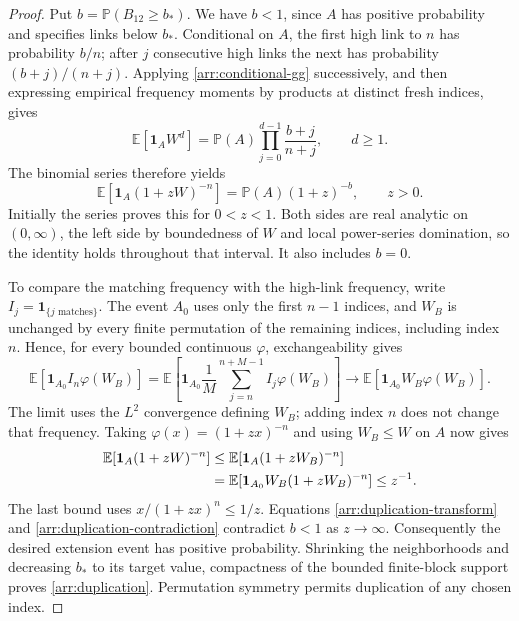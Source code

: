 \begin{proof}
Put $b=\mathbb P(B_{12}\geq b_*)$.  We have $b<1$, since $A$ has positive
probability and specifies links below $b_*$.  Conditional on $A$, the
first high link to $n$ has probability $b/n$; after $j$ consecutive high
links the next has probability $(b+j)/(n+j)$.  Applying
\eqref{arr:conditional-gg} successively, and then expressing empirical
frequency moments by products at distinct fresh indices, gives
\begin{equation}
 \mathbb E[\mathbf1_A W^d]
 =\mathbb P(A)\prod_{j=0}^{d-1}\frac{b+j}{n+j},
 \qquad d\geq1.
 \label{arr:duplication-moments}
\end{equation}
The binomial series therefore yields
\begin{equation}
 \mathbb E[\mathbf1_A(1+zW)^{-n}]
 =\mathbb P(A)(1+z)^{-b},\qquad z>0.
 \label{arr:duplication-transform}
\end{equation}
Initially the series proves this for $0<z<1$.  Both sides are real
analytic on $(0,\infty)$, the left side by boundedness of $W$ and local
power-series domination, so the identity holds throughout that interval.
It also includes $b=0$.

To compare the matching frequency with the high-link frequency, write
$I_j=\mathbf1_{\{j\text{ matches}\}}$.  The event $A_0$ uses only the
first $n-1$ indices, and $W_B$ is unchanged by every finite permutation
of the remaining indices, including index $n$.  Hence, for every bounded
continuous $\varphi$, exchangeability gives
\[
 \mathbb E[\mathbf1_{A_0}I_n\varphi(W_B)]
 =\mathbb E\left[\mathbf1_{A_0}
   \frac1M\sum_{j=n}^{n+M-1}I_j\varphi(W_B)\right]
 \longrightarrow
 \mathbb E[\mathbf1_{A_0}W_B\varphi(W_B)].
\]
The limit uses the $L^2$ convergence defining $W_B$; adding index $n$
does not change that frequency.  Taking
$\varphi(x)=(1+zx)^{-n}$ and using $W_B\le W$ on $A$ now gives
\begin{align}
 \mathbb E[\mathbf1_A(1+zW)^{-n}]
 &\leq\mathbb E[\mathbf1_A(1+zW_B)^{-n}]\notag\\
 &=\mathbb E[\mathbf1_{A_0}W_B(1+zW_B)^{-n}]
 \leq z^{-1}.
 \label{arr:duplication-contradiction}
\end{align}
The last bound uses $x/(1+zx)^n\leq1/z$.  Equations
\eqref{arr:duplication-transform} and
\eqref{arr:duplication-contradiction} contradict $b<1$ as $z\to\infty$.
Consequently the desired extension event has positive probability.
Shrinking the neighborhoods and decreasing $b_*$ to its target value,
compactness of the bounded finite-block support proves
\eqref{arr:duplication}.  Permutation symmetry permits duplication of
any chosen index.


\end{proof}
